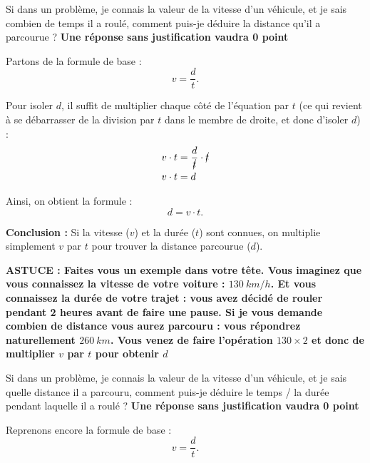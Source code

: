 \documentclass[answers]{exam}
\begin{document}
\begin{questions}
  \question[1.5] Si dans un problème, je connais la valeur de la vitesse d'un véhicule, et je sais combien de temps il a roulé, comment puis-je déduire la distance qu'il a parcourue ? \textbf{Une réponse sans justification vaudra 0 point}

  \begin{solution}
    Partons de la formule de base :
    \begin{equation}
    v = \frac{d}{t}.
    \end{equation}

    Pour isoler $d$, il suffit de multiplier chaque côté de l'équation par $t$ (ce qui revient à se débarrasser de la division par $t$ dans le membre de droite, et donc d'isoler $d$) :
    \begin{align*}
    v \cdot t &= \frac{d}{\cancel{t}} \cdot \cancel{t} \\
    v \cdot t &= d
    \end{align*}

    Ainsi, on obtient la formule :
    \begin{equation}
    d = v \cdot t.
    \end{equation}

    \textbf{Conclusion :} Si la vitesse ($v$) et la durée ($t$) sont connues, on multiplie simplement $v$ par $t$ pour trouver la distance parcourue ($d$). \par
    \vspace{1em}
    \textbf{ASTUCE : Faites vous un exemple dans votre tête. Vous imaginez que vous connaissez la vitesse de votre voiture : $\SI{130}{km/h}$. Et vous connaissez la durée de votre trajet : vous avez décidé de rouler pendant 2 heures avant de faire une pause. Si je vous demande combien de distance vous aurez parcouru : vous répondrez naturellement $\SI{260}{km}$. Vous venez de faire l'opération $130 \times 2$ et donc de multiplier $v$ par $t$ pour obtenir $d$}
  \end{solution}


  \question[1.5] Si dans un problème, je connais la valeur de la vitesse d'un véhicule, et je sais quelle distance il a parcouru, comment puis-je déduire le temps / la durée pendant laquelle il a roulé ? \textbf{Une réponse sans justification vaudra 0 point}
  \begin{solution}
    Reprenons encore la formule de base :
    \begin{equation}
    v = \frac{d}{t}.
    \end{equation}


\end{solution}
\end{questions}
\end{document}
